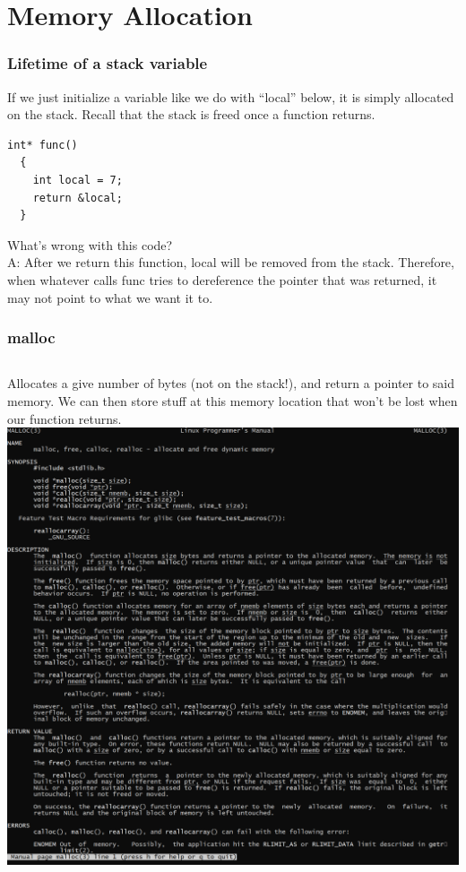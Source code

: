 \documentclass{beamer}
\begin{document}
\section{Memory Allocation}
\begin{frame}[fragile]
  \frametitle{Lifetime of a stack variable}
  If we just initialize a variable like we do with ``local'' below, it is simply allocated on the stack. Recall that the stack is freed once a function returns.
  \begin{lstlisting}[style=customc]
  int* func()
  {
    int local = 7;
    return &local;
  }
  \end{lstlisting}
  What's wrong with this code?\\
  \pause
  A: After we return this function, local will be removed from the stack. Therefore, when whatever calls func tries to dereference the pointer that was returned, it may not point to what we want it to.
\end{frame}
\begin{frame}
  \frametitle{malloc}
  \begin{columns}[c]
      Allocates a give number of bytes (not on the stack!), and return a pointer to said memory. We can then store stuff at this memory location that won't be lost when our function returns.
      \includegraphics[width=\textwidth,height=\textheight,keepaspectratio]{manmalloc.png}
  \end{columns}
\end{frame}
\end{document}
